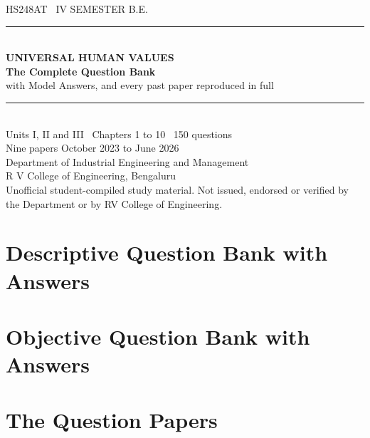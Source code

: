\documentclass[11pt,a4paper,oneside]{book}
\newcommand{\chapkind}{CHAPTER}
\begin{document}
\frontmatter
\pagestyle{empty}

\begin{center}
\vspace*{28mm}
{\sffamily\color{ocre}\large HS248AT \textbullet\ IV SEMESTER B.E.}\\[3mm]
{\color{rulegrey}\rule{0.55\textwidth}{1pt}}\\[9mm]
{\sffamily\bfseries\color{slate}\Huge UNIVERSAL HUMAN VALUES}\\[7mm]
{\sffamily\bfseries\color{slate}\LARGE The Complete Question Bank}\\[3mm]
{\sffamily\color{slatelight}\Large with Model Answers, and every past paper
 reproduced in full}\\[12mm]
{\color{rulegrey}\rule{0.55\textwidth}{1pt}}\\[9mm]
{\sffamily\color{slate}\large Units I, II and III \textbullet\ Chapters 1 to
 10 \textbullet\ 150 questions}\\[3mm]
{\sffamily\color{slatelight}\large Nine papers \quad\textbullet\quad
 October 2023 to June 2026}\\[16mm]
{\sffamily\color{slatelight} Department of Industrial Engineering and
 Management}\\[1mm]
{\sffamily\color{slatelight} R V College of Engineering, Bengaluru}\\
\vfill
{\footnotesize\sffamily\color{slatelight}
 Unofficial student-compiled study material. Not issued, endorsed or verified
 by the Department or by RV College of Engineering.}
\vspace*{10mm}
\end{center}
\clearpage



\clearpage
\tableofcontents

\mainmatter
\pagestyle{fancy}

\part{Descriptive Question Bank with Answers}




\part{Objective Question Bank with Answers}


\part{The Question Papers}


\appendix
\renewcommand{\chapkind}{APPENDIX}

\end{document}
